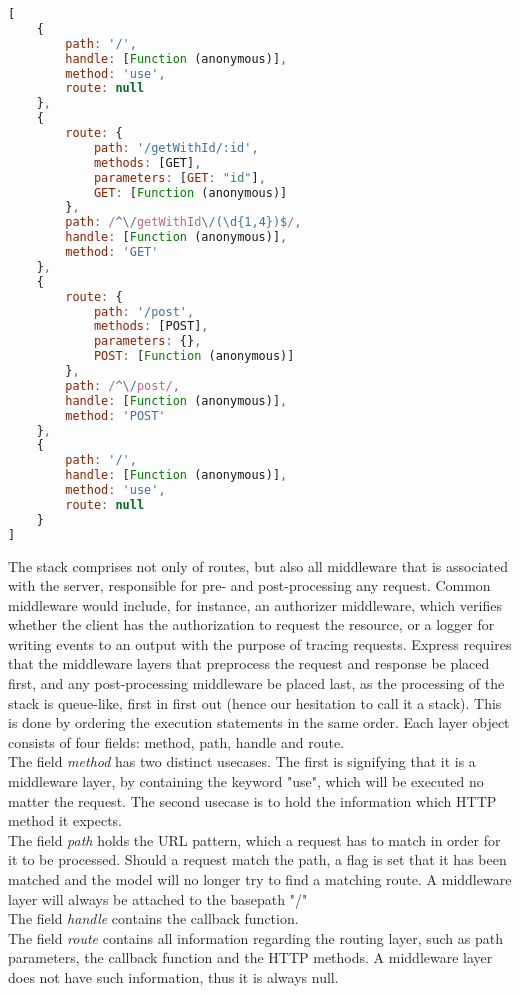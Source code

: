\begin{lstlisting}[language=JavaScript, label={lst:stack-example}, float=top,
	caption={The routing stack created by the express model.}]
[
    {
        path: '/',
        handle: [Function (anonymous)],
        method: 'use',
        route: null
    },
    {
        route: {
            path: '/getWithId/:id',
            methods: [GET],
            parameters: [GET: "id"],
            GET: [Function (anonymous)]
        },
        path: /^\/getWithId\/(\d{1,4})$/,
        handle: [Function (anonymous)],
        method: 'GET'
    },
    {
        route: {
            path: '/post',
            methods: [POST],
            parameters: {},
            POST: [Function (anonymous)]
        },
        path: /^\/post/,
        handle: [Function (anonymous)],
        method: 'POST'
    },
    {
        path: '/',
        handle: [Function (anonymous)],
        method: 'use',
        route: null
    }
]
\end{lstlisting}

The stack comprises not only of routes, but also all middleware that is associated with the server, responsible for pre- and post-processing any request. Common middleware would include, for instance, an authorizer middleware, which verifies whether the client has the authorization to request the resource, or a logger for writing events to an output with the purpose of tracing requests.
Express requires that the middleware layers that preprocess the request and response be placed first, and any post-processing middleware be placed last, as the processing of the stack is queue-like, first in first out (hence our hesitation to call it a stack). This is done by ordering the execution statements in the same order.
Each layer object consists of four fields: method, path, handle and route.\\
The field \textit{method} has two distinct usecases. The first is signifying that it is a middleware layer, by containing the keyword "use", which will be executed no matter the request.
The second usecase is to hold the information which HTTP method it expects. \\
The field \textit{path} holds the URL pattern, which a request has to match in order for it to be processed. Should a request match the path, a flag is set that it has been matched and the model will no longer try to find a matching route. A middleware layer will always be attached to the basepath "/"\\
The field \textit{handle} contains the callback function.\\
The field \textit{route} contains all information regarding the routing layer, such as path parameters, the callback function and the HTTP methods. A middleware layer does not have such information, thus it is always null.

